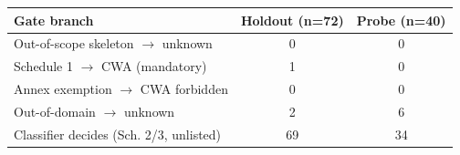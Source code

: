 \begin{tabular}{lcc}
\toprule
Gate branch & Holdout (n=72) & Probe (n=40) \\
\midrule
Out-of-scope skeleton $\to$ unknown & 0 & 0 \\
Schedule 1 $\to$ CWA (mandatory) & 1 & 0 \\
Annex exemption $\to$ CWA forbidden & 0 & 0 \\
Out-of-domain $\to$ unknown & 2 & 6 \\
Classifier decides (Sch. 2/3, unlisted) & 69 & 34 \\
\bottomrule
\end{tabular}